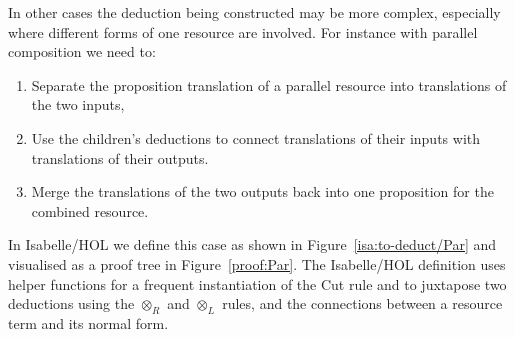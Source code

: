 \documentclass[class=smolathesis,crop=false]{standalone}
\begin{document}
In other cases the deduction being constructed may be more complex, especially where different forms of one resource are involved.
For instance with parallel composition we need to:
\begin{enumerate}
  \item Separate the proposition translation of a parallel resource into translations of the two inputs,
  \item Use the children's deductions to connect translations of their inputs with translations of their outputs.
  \item Merge the translations of the two outputs back into one proposition for the combined resource.
\end{enumerate}
In Isabelle/HOL we define this case as shown in Figure~\ref{isa:to-deduct/Par} and visualised as a proof tree in Figure~\ref{proof:Par}.
The Isabelle/HOL definition uses helper functions  for a frequent instantiation of the Cut rule and  to juxtapose two deductions using the $\otimes_R$ and $\otimes_L$ rules, and the connections between a resource term and its normal form.
\end{document}
